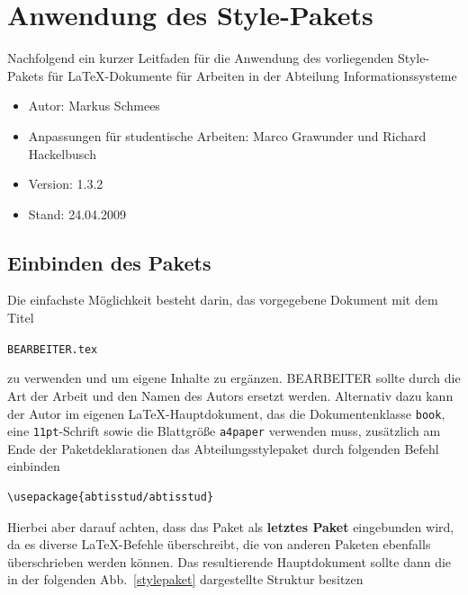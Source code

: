 \chapter{Anwendung des Style-Pakets} 
Nachfolgend ein kurzer Leitfaden f\"{u}r die Anwendung des
vorliegenden Style-Pakets f\"{u}r LaTeX-Dokumente f\"{u}r Arbeiten in der
Abteilung Informationssysteme

\begin{itemize}
\item Autor: Markus Schmees
\item Anpassungen f\"{u}r studentische Arbeiten: Marco Grawunder und Richard Hackelbusch
\item Version: 1.3.2
\item Stand: 24.04.2009
\end{itemize}

\section{Einbinden des Pakets}
Die einfachste M\"{o}glichkeit besteht darin, das vorgegebene Dokument
mit dem Titel

\texttt{BEARBEITER.tex}

zu verwenden und um eigene
Inhalte zu erg\"{a}nzen. BEARBEITER sollte durch die Art der Arbeit und den Namen des Autors ersetzt werden. Alternativ dazu kann der Autor im eigenen
\LaTeX-Hauptdokument, das die Dokumentenklasse \texttt{book}, eine
\texttt{11pt}-Schrift sowie die Blattgr\"{o}{\ss}e \texttt{a4paper}
verwenden muss, zus\"{a}tzlich am Ende der Paketdeklarationen das
Abteilungsstylepaket durch folgenden Befehl einbinden

\begin{verbatim}
\usepackage{abtisstud/abtisstud}
\end{verbatim}

Hierbei aber darauf achten, dass das Paket als \textbf{letztes
Paket} eingebunden wird, da es diverse \LaTeX-Befehle
\"{u}berschreibt, die von anderen Paketen ebenfalls \"{u}berschrieben
werden k\"{o}nnen. Das resultierende Hauptdokument sollte dann die in
der folgenden Abb.~\ref{stylepaket} dargestellte Struktur besitzen

